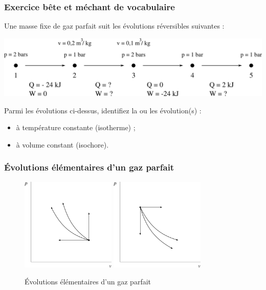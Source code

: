 \subsubsection{Exercice bête et méchant de vocabulaire}

	\wherefrom{[DS n°2 2010, 2pts]}

	Une masse fixe de gaz parfait suit les évolutions réversibles suivantes :

		\begin{center}
			\includegraphics[width=\textwidth]{images/exo.png}
		\end{center}

	Parmi les évolutions ci-dessus, identifiez la ou les évolution(s) : 
	\begin{itemize}
		\item à température constante (isotherme) ;
		\item à volume constant (isochore).
	\end{itemize}


\subsubsection{Évolutions élémentaires d’un gaz parfait}

	
	\begin{figure}
		\begin{center}
			\vspace{-0.1cm}%
			\includegraphics[width=0.4\textwidth]{images/pvel1.png}
			\includegraphics[width=0.4\textwidth]{images/pvel2.png}
			\vspace{-0.1cm}%
		\end{center}
		\caption{Évolutions élémentaires d’un gaz parfait}
		\label{fig_pvel}
	\end{figure}


